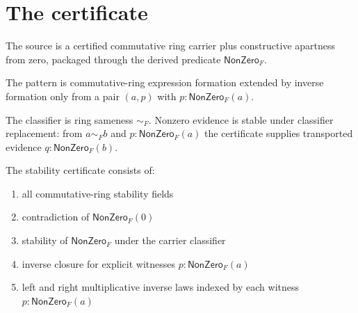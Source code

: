 \section{The certificate}

\begin{definition}
\label{def:field-source-specification}
The source is a certified commutative ring carrier plus constructive apartness from zero, packaged through the derived predicate $\mathsf{NonZero}_F$.
\end{definition}

\begin{definition}
\label{def:field-pattern-specification}
The pattern is commutative-ring expression formation extended by inverse formation only from a pair $(a,p)$ with $p:\mathsf{NonZero}_F(a)$.
\end{definition}

\begin{definition}
\label{def:field-classifier-specification}
The classifier is ring sameness $\sim_F$. Nonzero evidence is stable under classifier replacement: from $a\sim_F b$ and $p:\mathsf{NonZero}_F(a)$ the certificate supplies transported evidence $q:\mathsf{NonZero}_F(b)$.
\end{definition}

\begin{definition}
\label{def:field-stability-certificate}
The stability certificate consists of:
\begin{enumerate}
  \item all commutative-ring stability fields
  \item contradiction of $\mathsf{NonZero}_F(0)$
  \item stability of $\mathsf{NonZero}_F$ under the carrier classifier
  \item inverse closure for explicit witnesses $p:\mathsf{NonZero}_F(a)$
  \item left and right multiplicative inverse laws indexed by each witness $p:\mathsf{NonZero}_F(a)$
\end{enumerate}
\end{definition}

